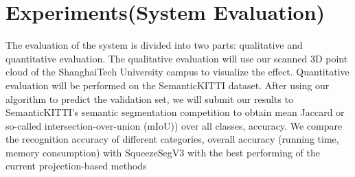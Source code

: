 \documentclass[final]{cvpr}
\begin{document}
\section{Experiments(System Evaluation)}
The evaluation of the system is divided into two parts: qualitative and quantitative evaluation. The qualitative evaluation will use our scanned 3D point cloud of the ShanghaiTech University campus to visualize the effect. Quantitative evaluation will be performed on the SemanticKITTI dataset. After using our algorithm to predict the validation set, we will submit our results to SemanticKITTI’s semantic segmentation competition to obtain mean Jaccard or so-called intersection-over-union (mIoU)) over all classes, accuracy. We compare the recognition accuracy of different categories, overall accuracy (running time, memory consumption) with SqueezeSegV3\cite{xu2020squeezesegv3} with the best performing of the current projection-based methods 
\end{document}
